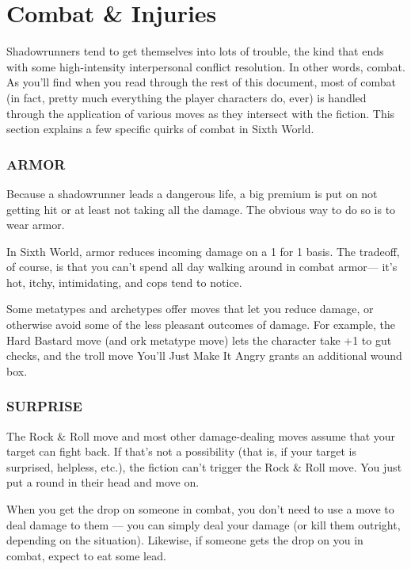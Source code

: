 \chapter{Combat \& Injuries} \label{combat}

Shadowrunners tend to get themselves into lots of trouble, the kind that ends with some high-intensity interpersonal conflict resolution. In other words, combat. As you’ll find when you read through the rest of this document, most of combat (in fact, pretty much everything the player characters do, ever) is handled through the application of various moves as they intersect with the fiction. This section explains a few specific quirks of combat in Sixth World.


\subsection*{ARMOR}
Because a shadowrunner leads a dangerous life, a big premium is put on not getting hit or at least not taking all the damage. The obvious way to do so is to wear armor.

In Sixth World, armor reduces incoming damage on a 1 for 1 basis. The tradeoff, of course, is that you can’t spend all day walking around in combat armor— it’s hot, itchy, intimidating, and cops tend to notice.

Some metatypes and archetypes offer moves that let you reduce damage, or otherwise avoid some of the less pleasant outcomes of damage. For example, the Hard Bastard move (and ork metatype move) lets the character take +1 to gut checks, and the troll move You’ll Just Make It Angry grants an additional wound box.



\subsection*{SURPRISE}
The Rock \& Roll move and most other damage-dealing moves assume that your target can fight back. If that’s not a possibility (that is, if your target is surprised, helpless, etc.), the fiction can’t trigger the Rock \& Roll move. You just put a round in their head and move on.

When you get the drop on someone in combat, you don’t need to use a move to deal damage to them — you can simply deal your damage (or kill them outright, depending on the situation). Likewise, if someone gets the drop on you in combat, expect to eat some lead.


